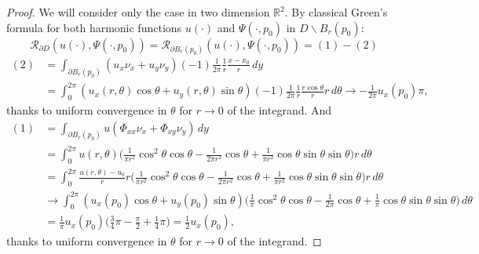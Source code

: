 \documentclass[10pt, a4paper, twoside, openright]{book}
\theoremstyle{definition}
\theoremstyle{plain}
\theoremstyle{plain}
\theoremstyle{plain}
\theoremstyle{plain}
\theoremstyle{plain}
\theoremstyle{plain}
\theoremstyle{plain}
\theoremstyle{plain}
\begin{document}
\begin{proof}
 We will consider only the case in two dimension $\mathbb{R}^2$.
 By classical Green's formula for both harmonic functions $u(\cdot)$ and $\Psi(\cdot,p_0)$ in $D\backslash B_r(p_0)$:
 \[\mathcal{R}_{\partial D}(u(\cdot),\Psi(\cdot,p_0)) = \mathcal{R}_{\partial B_r(p_0)}(u(\cdot),\Psi(\cdot,p_0)) = (1) - (2)\]
 \begin{align*}
 (2)&=\int_{\partial B_r(p_0)}(u_x\nu_x+u_y\nu_y)(-1)\frac{1}{2\pi}\frac{1}{r}\frac{x-x_0}{r}\,dy\\
 &= \int_0^{2\pi}(u_x(r,\theta)\cos\theta+u_y(r,\theta)\sin\theta)(-1)\frac{1}{2\pi}\frac{1}{r}\frac{r\cos\theta}{r}r\,d\theta \to -\frac{1}{2\pi}u_x(p_0)\pi,
 \end{align*}
 thanks to uniform convergence in $\theta$ for $r\to0$ of the integrand. And
 \begin{align*}
 (1)&=\int_{\partial B_r(p_0)}u(\Phi_{xx}\nu_x + \Phi_{xy}\nu_y)\,dy\\
 &= \int_0^{2\pi}u(r,\theta)\Big(\frac{1}{\pi r^2}\cos^2\theta\cos\theta - \frac{1}{2\pi r^2}\cos\theta + \frac{1}{\pi r^2}\cos\theta\sin\theta\sin\theta\Big)r\,d\theta\\
 &= \int_0^{2\pi}\frac{u(r,\theta)-u_0}{r}r\Big(\frac{1}{\pi r^2}\cos^2\theta\cos\theta - \frac{1}{2\pi r^2}\cos\theta + \frac{1}{\pi r^2}\cos\theta\sin\theta\sin\theta\Big)r\,d\theta\\
 & \to \int_0^{2\pi}(u_x(p_0)\cos\theta + u_y(p_0)\sin\theta)\Big(\frac{1}{\pi}\cos^2\theta\cos\theta - \frac{1}{2\pi}\cos\theta + \frac{1}{\pi}\cos\theta\sin\theta\sin\theta\Big)\,d\theta\\
 &= \frac{1}{\pi}u_x(p_0)\Big(\frac{3}{4}\pi-\frac{\pi}{2}+\frac{1}{4}\pi\Big) = \frac{1}{2}u_x(p_0),
 \end{align*}
 thanks to uniform convergence in $\theta$ for $r\to0$ of the integrand.
\end{proof}
% 
% 
% 
\end{document}
